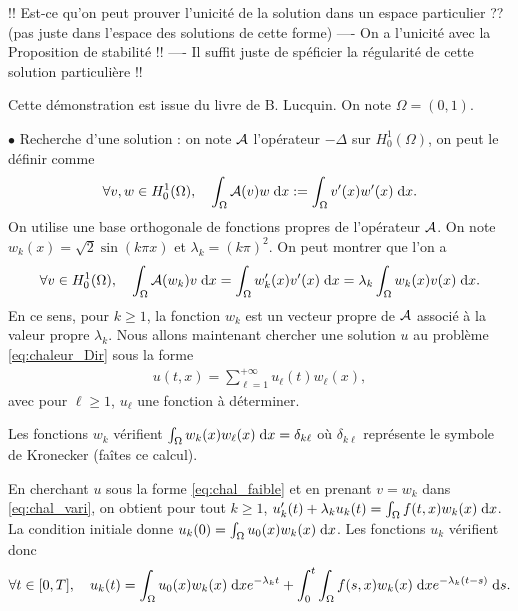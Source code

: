 \documentclass[12pt,a4paper,twoside]{article}
\begin{document}
!! Est-ce qu'on peut prouver l'unicit\'e de la solution dans un espace particulier ??
(pas juste dans l'espace des solutions de cette forme)
---- On a l'unicit\'e avec la Proposition de stabilit\'e !!
---- Il suffit juste de sp\'eficier la r\'egularit\'e de cette solution particuli\`ere !!



Cette d\'emonstration est issue du livre de B. Lucquin.
On note $\Omega = (0,1)$.

$\bullet$ Recherche d'une solution :
on note $\mathcal{A}$ l'op\'erateur $-\Delta$ sur $H^1_0(\Omega)$,
on peut le d\'efinir comme
\begin{align*}
  \forall v,w \in H_0^1(\Omega) , \quad  \int_{\Omega} \mathcal{A}(v) w \;\mathrm{d} x
  := \int_{\Omega} v'(x) w'(x) \;\mathrm{d} x .
\end{align*}
On utilise une base orthogonale de fonctions propres de l'op\'erateur $\mathcal{A}$.
On note $w_k(x) = \sqrt{2} \sin(k \pi x)$ et $\lambda_k = (k\pi)^2$.
On peut montrer que l'on a
\begin{align*}
  \forall v \in H_0^1(\Omega) , \quad
  \int_{\Omega} \mathcal{A}(w_k) v \;\mathrm{d} x 
  = \int_{\Omega} w_k'(x) v'(x) \;\mathrm{d} x = \lambda_k \int_{\Omega} w_k(x) v(x) \;\mathrm{d} x .
\end{align*}
En ce sens, pour $k \geq 1$, la fonction $w_k$ est un vecteur propre de $\mathcal{A}$
associ\'e \`a la valeur propre $\lambda_k$.
Nous allons maintenant chercher une solution $u$ au probl\`eme \eqref{eq:chaleur_Dir}
sous la forme
\begin{align}
  \label{eq:chal_faible}
  u(t,x) = \sum_{\ell = 1}^{+\infty} u_{\ell} (t) w_{\ell} (x) ,
\end{align}
avec pour $\ell \geq 1$, $u_{\ell}$ une fonction \`a d\'eterminer.

Les fonctions $w_k$ v\'erifient $\int_{\Omega} w_k (x) w_{\ell}(x) \;\mathrm{d} x = \delta_{k \ell}$
o\`u $\delta_{k\ell}$ repr\'esente le symbole de Kronecker (fa\^ites ce calcul).

En cherchant $u$ sous la forme \eqref{eq:chal_faible} et en prenant $v = w_k$
dans \eqref{eq:chal_vari}, on obtient
pour tout $k \geq 1$, $u_k'(t) + \lambda_k u_k(t) = \int_{\Omega} f(t,x) w_k(x) \;\mathrm{d} x$.
La condition initiale donne $u_k(0) = \int_{\Omega} u_0(x) w_k(x) \;\mathrm{d} x$.
Les fonctions $u_k$ v\'erifient donc 
\begin{align}
  \label{eq:chal_faible_sol}
  \forall t \in [0,T] , \quad u_k(t) = \int_{\Omega} u_0(x) w_k(x) \;\mathrm{d} x e^{- \lambda_k t}
  + \int_{0}^t \int_{\Omega} f(s,x) w_k(x) \;\mathrm{d} x e^{- \lambda_k (t-s)} \;\mathrm{d} s .
\end{align}
\end{document}
